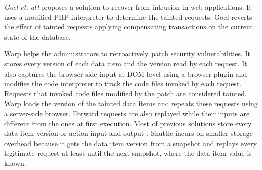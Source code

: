 {\emph{Goel et. all} \cite{Akkus2010} proposes a solution to recover from intrusion in web applications. It uses a modified PHP interpreter to determine the tainted requests. Goel reverts the effect of tainted requests applying compensating transactions on the current state of the database. 

Warp \cite{warp} helps the administrators to retroactively patch security vulnerabilities. It stores every version of each data item and the version read by each request. It also captures the browser-side input at DOM level using a browser plugin and modifies the code interpreter to track the code files invoked by each request. Requests that invoked code files modified by the patch are considered tainted. Warp loads the version of the tainted data items and repeats these requests using a server-side browser. Forward requests are also replayed while their inputs are different from the ones at first execution. Most of previous solutions store every data item version or action input and output \cite{warp,aire}. Shuttle incurs on smaller storage overhead because it gets the data item version from a snapshot and replays every legitimate request at least until the next snapshot, where the data item value is known.

}
